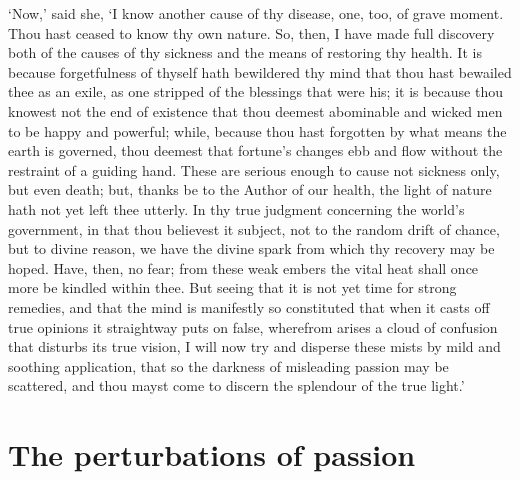 \documentclass[11pt]{book}
\begin{document}
`Now,' said she, `I know another cause of thy disease, one, too, of
grave moment. Thou hast ceased to know thy own nature. So, then, I have
made full discovery both of the causes of thy sickness and the means of
restoring thy health. It is because forgetfulness of thyself hath
bewildered thy mind that thou hast bewailed thee as an exile, as one
stripped of the blessings that were his; it is because thou knowest not
the end of existence that thou deemest abominable and wicked men to be
happy and powerful; while, because thou hast forgotten by what means the
earth is governed, thou deemest that fortune's changes ebb and flow
without the restraint of a guiding hand. These are serious enough to
cause not sickness only, but even death; but, thanks be to the Author of
our health, the light of nature hath not yet left thee utterly. In thy
true judgment concerning the world's government, in that thou believest
it subject, not to the random drift of chance, but to divine reason, we
have the divine spark from which thy recovery may be hoped. Have, then,
no fear; from these weak embers the vital heat shall once more be
kindled within thee. But seeing that it is not yet time for strong
remedies, and that the mind is manifestly so constituted that when it
casts off true opinions it straightway puts on false, wherefrom arises a
cloud of confusion that disturbs its true vision, I will now try and
disperse these mists by mild and soothing application, that so the
darkness of misleading passion may be scattered, and thou mayst come to
discern the splendour of the true light.'


\section{The perturbations of passion}
\end{document}
